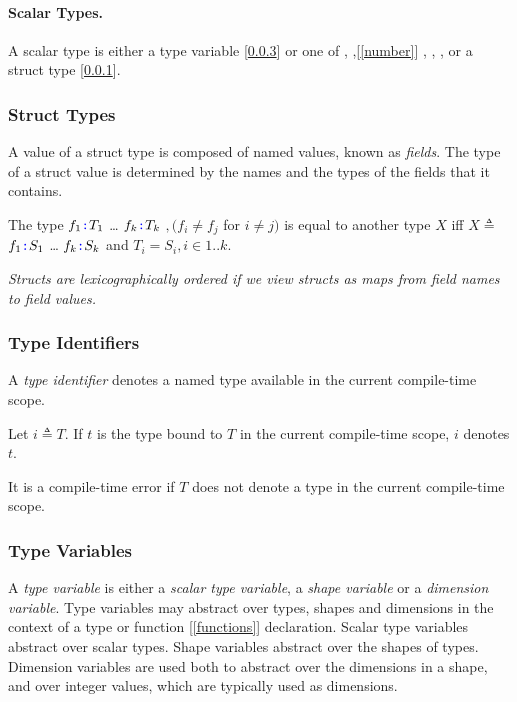 \documentclass{article}
\begin{document}
\paragraph{Scalar Types.}
 A scalar type is either a type variable [\ref{typeVariables}] or one of \BOOL [\ref{bool}],  \NUMBER,[\ref{number}] \INT, \FLOAT, \STRING [\ref{string}], or a struct type [\ref{structTypes}].

\subsubsection{Struct Types}
\label{structTypes}

A value of a struct type is composed of named values, known as {\em fields}. The type of a struct value is determined by the names and the types of the fields that it contains.

\StructType{}

\PropertySig{}

The type \LCURLY{}$f_1 \texttt{\color{blue} :}{} T_1$\COMMA{} \ldots\COMMA{}  $f_k \texttt{\color{blue} :}{} T_k$\RCURLY{} $, (f_i \ne f_j$ for $i \ne j)$ is equal to another type $X$ iff  $X \triangleq $ \LCURLY{}$f_1 \texttt{\color{blue} :}{} S_1$\COMMA{} \ldots\COMMA{}  $f_k \texttt{\color{blue} :}{} S_k$\RCURLY{} and $T_i = S_i, i \in 1..k$.


{\em
Structs are lexicographically ordered if we view structs as maps from field names to field values. 
}

\subsubsection{Type Identifiers}
\label{typeIdentifiers}

A {\em type identifier} denotes a named type available in the current compile-time scope.

Let $i \triangleq T$. If $t$ is the type bound to $T$ in the current compile-time scope, $i$ denotes $t$. 

It is a compile-time error if $T$ does not denote a type in the current compile-time scope.

\subsubsection{Type Variables}
\label{typeVariables}

A {\em type variable} is either a {\em scalar type variable}, a {\em shape variable} or a {\em dimension variable}. Type variables may abstract over types, shapes and dimensions in the context of a type or function [\ref{functions}] declaration. Scalar type variables abstract over  scalar types. Shape variables abstract over the shapes of types. Dimension variables are used both to abstract over the dimensions in a shape, and over integer values, which are typically used as dimensions.
\end{document}
